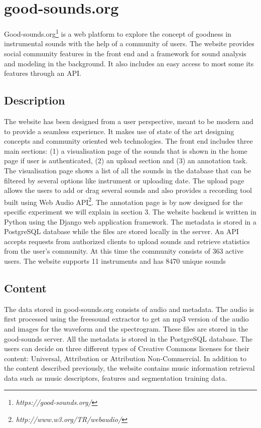 \documentclass{article}
\begin{document}
\section{good-sounds.org}\label{sec:goodsounds}
Good-sounds.org\footnote{\textit{https://good-sounds.org/}} is a web platform to explore the concept of goodness in instrumental sounds with the help of a community of users. The website provides social community features in the front end and a framework for sound analysis and modeling in the background. It also includes an easy access to most some its features through an API.

\subsection{Description} 
The website has been designed from a user perspective,  meant to be modern and to provide a seamless experience. It makes use of state of the art designing concepts and community oriented web technologies. The front end includes three main sections: (1) a visualisation page of the sounds that is shown in the home page if user is authenticated, (2) an upload section and (3) an annotation task. The visualisation page shows a list of all the sounds in the database that can be filtered by several options like instrument or uploading date. The upload page allows the users to add or drag several sounds and also provides a recording tool built using Web Audio API\footnote{\textit{http://www.w3.org/TR/webaudio/}}. The annotation page is by now designed for the specific experiment we will explain in section 3. 
The website backend is written in Python using the Django web application framework. The metadata is stored in a PostgreSQL database while the files are stored locally in the server. An API accepts requests from authorized clients to upload sounds and retrieve statistics from the user’s community. 
At this time the community consists of 363 active users. The website supports 11 instruments and has 8470 unique sounds

\subsection{Content}
The data stored in good-sounds.org consists of audio and metadata. The audio is first processed using the freesound extractor \cite{02} to get an mp3 version of the audio and images for the waveform and the spectrogram. These files are stored in the good-sounds server. All the metadata is stored in the PostgreSQL database. The users can decide on three different types of Creative Commons licenses for their content: Universal, Attribution or Attribution Non-Commercial. 
In addition to the content described previously, the website contains music information retrieval data such as music descriptors, features and segmentation training data.
\end{document}
